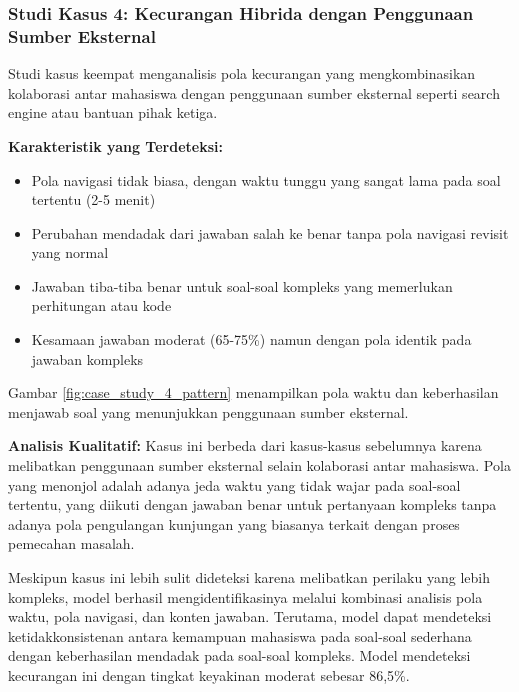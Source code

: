 \subsubsection{Studi Kasus 4: Kecurangan Hibrida dengan Penggunaan Sumber Eksternal}

Studi kasus keempat menganalisis pola kecurangan yang mengkombinasikan kolaborasi antar mahasiswa dengan penggunaan sumber eksternal seperti search engine atau bantuan pihak ketiga.

\textbf{Karakteristik yang Terdeteksi:}
\begin{itemize}
    \item Pola navigasi tidak biasa, dengan waktu tunggu yang sangat lama pada soal tertentu (2-5 menit)
    \item Perubahan mendadak dari jawaban salah ke benar tanpa pola navigasi revisit yang normal
    \item Jawaban tiba-tiba benar untuk soal-soal kompleks yang memerlukan perhitungan atau kode
    \item Kesamaan jawaban moderat (65-75\%) namun dengan pola identik pada jawaban kompleks
\end{itemize}

Gambar \ref{fig:case_study_4_pattern} menampilkan pola waktu dan keberhasilan menjawab soal yang menunjukkan penggunaan sumber eksternal.


\textbf{Analisis Kualitatif:}
Kasus ini berbeda dari kasus-kasus sebelumnya karena melibatkan penggunaan sumber eksternal selain kolaborasi antar mahasiswa. Pola yang menonjol adalah adanya jeda waktu yang tidak wajar pada soal-soal tertentu, yang diikuti dengan jawaban benar untuk pertanyaan kompleks tanpa adanya pola pengulangan kunjungan yang biasanya terkait dengan proses pemecahan masalah.

Meskipun kasus ini lebih sulit dideteksi karena melibatkan perilaku yang lebih kompleks, model berhasil mengidentifikasinya melalui kombinasi analisis pola waktu, pola navigasi, dan konten jawaban. Terutama, model dapat mendeteksi ketidakkonsistenan antara kemampuan mahasiswa pada soal-soal sederhana dengan keberhasilan mendadak pada soal-soal kompleks. Model mendeteksi kecurangan ini dengan tingkat keyakinan moderat sebesar 86,5\%.

